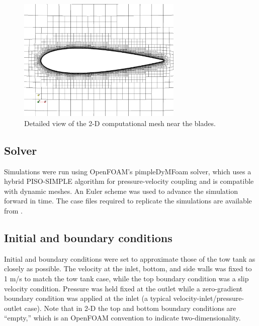 \documentclass[aip,graphicx]{revtex4-1}
\begin{document}
\begin{figure}
    \centering

    \includegraphics[width=0.7\textwidth]{2D_blade_mesh_closeup}

    \caption{Detailed view of the 2-D computational mesh near the blades.}

    \label{fig:blade-mesh}
\end{figure}


\subsection{Solver}

Simulations were run using OpenFOAM's pimpleDyMFoam solver, which uses a hybrid
PISO-SIMPLE algorithm for pressure-velocity coupling and is compatible with
dynamic meshes. An Euler scheme was used to advance the simulation forward in
time. The case files required to replicate the simulations are available from
\cite{Bachant2016-UNH-RVAT-2D-OpenFOAM-SST, Bachant2016-UNH-RVAT-2D-OpenFOAM-SA,
Bachant2016-UNH-RVAT-3D-OpenFOAM-SST, Bachant2016-UNH-RVAT-3D-OpenFOAM-SA}.


\subsection{Initial and boundary conditions}

Initial and boundary conditions were set to approximate those of the tow tank as
closely as possible. The velocity at the inlet, bottom, and side walls was fixed
to 1 m/s to match the tow tank case, while the top boundary condition was a slip
velocity condition. Pressure was held fixed at the outlet while a zero-gradient
boundary condition was applied at the inlet (a typical
velocity-inlet/pressure-outlet case). Note that in 2-D the top and bottom
boundary conditions are ``empty,'' which is an OpenFOAM convention to indicate
two-dimensionality.
\end{document}
